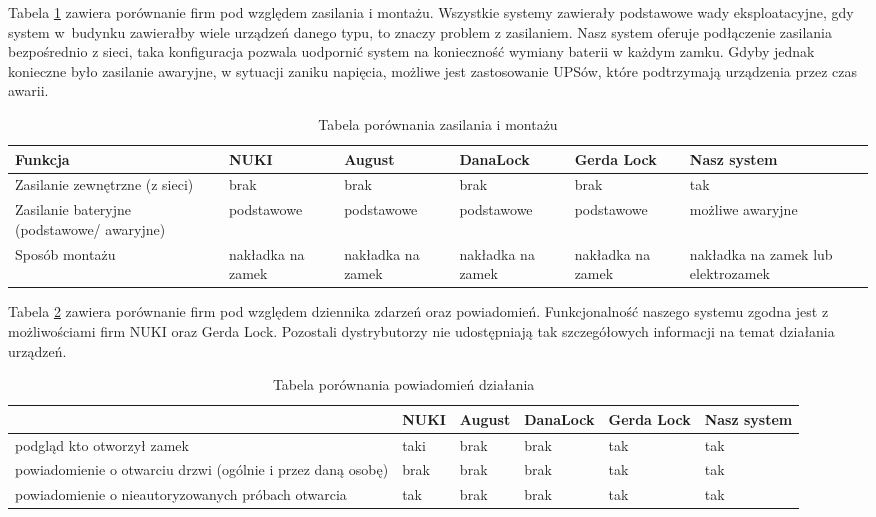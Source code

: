  	Tabela \ref{tab:porownanie2} zawiera porównanie firm pod względem zasilania i montażu. Wszystkie systemy zawierały podstawowe wady eksploatacyjne, gdy system w~budynku zawierałby wiele urządzeń danego typu, to znaczy problem z zasilaniem. Nasz system oferuje podłączenie zasilania bezpośrednio z sieci, taka konfiguracja pozwala uodpornić system na konieczność wymiany baterii w każdym zamku. Gdyby jednak konieczne było zasilanie awaryjne, w sytuacji zaniku napięcia, możliwe jest zastosowanie UPSów, które podtrzymają urządzenia przez czas awarii.
 \begin{longtable}[!ht]{|m{5cm}|m{1.7cm}|m{1.7cm}|m{1.7cm}|m{2cm}|m{2.4cm}|} 
 	\caption{Tabela porównania zasilania i montażu}
 	\label{tab:porownanie2}\\
 	\hline	
 	Funkcja & NUKI & August &DanaLock & Gerda Lock & Nasz system \\	\hline
 	Zasilanie zewnętrzne (z sieci)	
 	& brak & brak & brak & brak & tak \\	\hline
	 Zasilanie bateryjne \newline (podstawowe/ awaryjne)	
	 & podstawowe & podstawowe &podstawowe & podstawowe & możliwe \newline awaryjne \\	\hline
 	Sposób montażu	
 	& nakładka na \linebreak zamek & nakładka na \linebreak zamek & nakładka na \linebreak zamek & nakładka na \linebreak zamek & nakładka na \newline zamek lub  \newline elektrozamek  \\	\hline
 \end{longtable}
 
Tabela \ref{tab:porownanie3} zawiera porównanie firm pod względem dziennika zdarzeń oraz powiadomień. Funkcjonalność naszego systemu zgodna jest z możliwościami firm NUKI oraz Gerda Lock. Pozostali dystrybutorzy nie udostępniają tak szczegółowych informacji na temat działania urządzeń.
\begin{longtable}[!ht]{|m{6cm}|m{1.4cm}|m{1.4cm}|m{1.7cm}|m{2cm}|m{2cm}|} 
	\caption{Tabela porównania powiadomień działania}
	\label{tab:porownanie3}\\
	\hline	
	& NUKI & August & DanaLock & Gerda Lock & Nasz system \\	\hline
	podgląd kto otworzył zamek
	& taki & brak & brak & tak & tak \\	\hline
	powiadomienie o otwarciu drzwi \newline (ogólnie i przez daną osobę)
	& brak & brak & brak & tak & tak  \\	\hline
	powiadomienie o nieautoryzowanych próbach otwarcia
	& tak & brak & brak & tak & tak  \\	\hline
\end{longtable}

